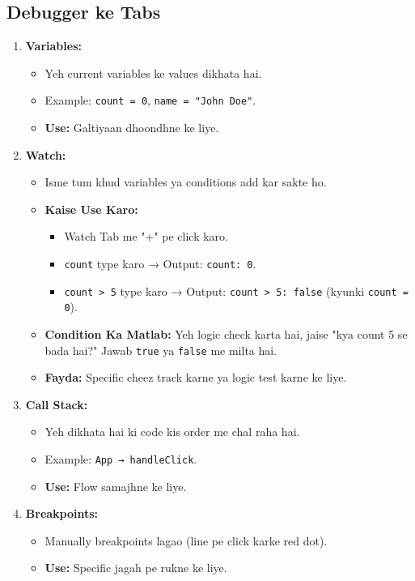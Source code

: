 \documentclass[a4paper,12pt]{article}
\begin{document}
\subsection{ Debugger ke Tabs}
\begin{enumerate}
    \item \textbf{\color{myblue}Variables:}  
    \begin{itemize}
        \item Yeh current variables ke values dikhata hai.
        \item Example: \texttt{\color{mygreen}count = 0}, \texttt{\color{mygreen}name = "John Doe"}.
        \item \textbf{\color{myblue}Use:} Galtiyaan dhoondhne ke liye.
    \end{itemize}

    \item \textbf{\color{myblue}Watch:}  
    \begin{itemize}
        \item Isme tum khud variables ya conditions add kar sakte ho.
        \item \textbf{\color{myblue}Kaise Use Karo:}  
        \begin{itemize}
            \item Watch Tab me "+" pe click karo.
            \item \texttt{\color{mygreen}count} type karo → Output: \texttt{\color{mygreen}count: 0}.
            \item \texttt{\color{mygreen}count > 5} type karo → Output: \texttt{\color{mygreen}count > 5: false} (kyunki \texttt{\color{mygreen}count = 0}).
        \end{itemize}
        \item \textbf{\color{myblue}Condition Ka Matlab:} Yeh logic check karta hai, jaise "kya count 5 se bada hai?" Jawab \texttt{\color{mygreen}true} ya \texttt{\color{mygreen}false} me milta hai.
        \item \textbf{\color{myblue}Fayda:} Specific cheez track karne ya logic test karne ke liye.
    \end{itemize}

    \item \textbf{\color{myblue}Call Stack:}  
    \begin{itemize}
        \item Yeh dikhata hai ki code kis order me chal raha hai.
        \item Example: \texttt{\color{mygreen}App → handleClick}.
        \item \textbf{\color{myblue}Use:} Flow samajhne ke liye.
    \end{itemize}

    \item \textbf{\color{myblue}Breakpoints:}  
    \begin{itemize}
        \item Manually breakpoints lagao (line pe click karke red dot).
        \item \textbf{\color{myblue}Use:} Specific jagah pe rukne ke liye.
    \end{itemize}
\end{enumerate}
\end{document}
